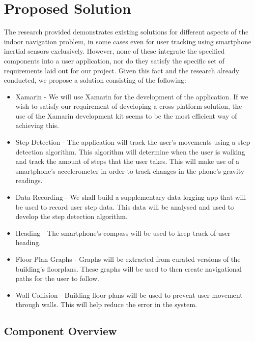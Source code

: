 \documentclass[main.tex]{subfiles}
\begin{document}
\chapter{Proposed Solution}

The research provided demonstrates existing solutions for different aspects of the indoor navigation problem, in some cases even for user tracking using smartphone inertial sensors exclusively. However, none of these integrate the specified components into a user application, nor do they satisfy the specific set of requirements laid out for our project. 
Given this fact and the research already conducted, we propose a solution consisting of the following:

\begin{itemize}

\item Xamarin - We will use Xamarin for the development of the application. If we wish to satisfy our requirement of developing a cross platform solution, the use of the Xamarin development kit seems to be the most efficient way of achieving this.

\item Step Detection - The application will track the user's movements using a step detection algorithm. This algorithm will determine when the user is walking and track the amount of steps that the user takes. This will make use of a smartphone's accelerometer in order to track changes in the phone's gravity readings.

\item Data Recording - We shall build a supplementary data logging app that will be used to record user step data. This data will be analysed and used to develop the step detection algorithm.

\item Heading - The smartphone's compass will be used to keep track of user heading.

\item Floor Plan Graphs - Graphs will be extracted from curated versions of the building's floorplans. These graphs will be used to then create navigational paths for the user to follow.

\item Wall Collision - Building floor plans will be used to prevent user movement through walls. This will help reduce the error in the system.

\end{itemize}

\section{Component Overview}
\end{document}
